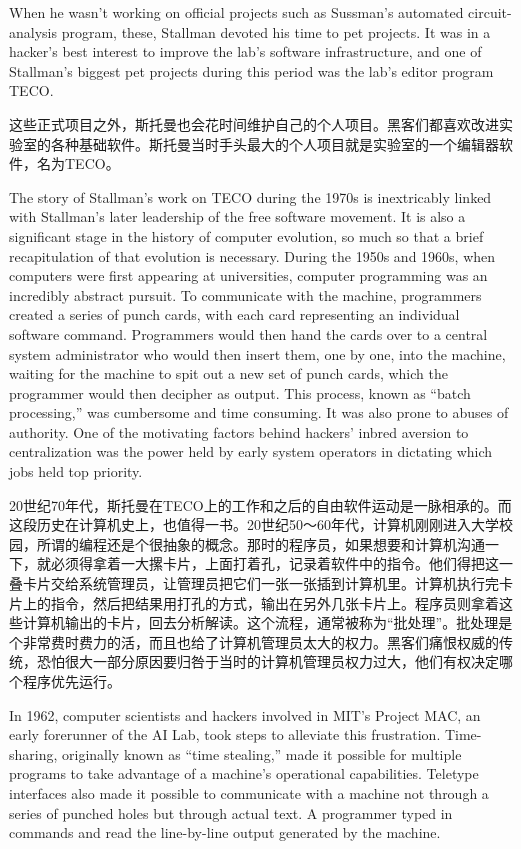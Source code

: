 \ifdefined\eng
When he wasn't working on official projects such as \ifdefined\vone Sussman's automated circuit-analysis program, \fi\ifdefined\vtwo these, \fi Stallman devoted his time to pet projects. It was in a hacker's best interest to improve the lab's software infrastructure, and one of Stallman's biggest pet projects during this period was the lab's editor program TECO.
\fi

\ifdefined\chs
这些正式项目之外，斯托曼也会花时间维护自己的个人项目。黑客们都喜欢改进实验室的各种基础软件。斯托曼当时手头最大的个人项目就是实验室的一个编辑器软件，名为TECO。
\fi

\ifdefined\eng
The story of Stallman's work on TECO during the 1970s is inextricably linked with Stallman's later leadership of the free software movement. It is also a significant stage in the history of computer evolution, so much so that a brief recapitulation of that evolution is necessary. During the 1950s and 1960s, when computers were first appearing at universities, computer programming was an incredibly abstract pursuit. To communicate with the machine, programmers created a series of punch cards, with each card representing an individual software command. Programmers would then hand the cards over to a central system administrator who would then insert them, one by one, into the machine, waiting for the machine to spit out a new set of punch cards, which the programmer would then decipher as output. This process, known as ``batch processing,'' was cumbersome and time consuming. It was also prone to abuses of authority. One of the motivating factors behind hackers' inbred aversion to centralization was the power held by early system operators in dictating which jobs held top priority.
\fi

\ifdefined\chs
20世纪70年代，斯托曼在TECO上的工作和之后的自由软件运动是一脉相承的。而这段历史在计算机史上，也值得一书。20世纪50～60年代，计算机刚刚进入大学校园，所谓的编程还是个很抽象的概念。那时的程序员，如果想要和计算机沟通一下，就必须得拿着一大摞卡片，上面打着孔，记录着软件中的指令。他们得把这一叠卡片交给系统管理员，让管理员把它们一张一张插到计算机里。计算机执行完卡片上的指令，然后把结果用打孔的方式，输出在另外几张卡片上。程序员则拿着这些计算机输出的卡片，回去分析解读。这个流程，通常被称为``批处理''。批处理是个非常费时费力的活，而且也给了计算机管理员太大的权力。黑客们痛恨权威的传统，恐怕很大一部分原因要归咎于当时的计算机管理员权力过大，他们有权决定哪个程序优先运行。
\fi

\ifdefined\eng
In 1962, computer scientists and hackers involved in MIT's Project MAC, an early forerunner of the AI Lab, took steps to alleviate this frustration. Time-sharing, originally known as ``time stealing,'' made it possible for multiple programs to take advantage of a machine's operational capabilities. Teletype interfaces also made it possible to communicate with a machine not through a series of punched holes but through actual text. A programmer typed in commands and read the line-by-line output generated by the machine.
\fi

